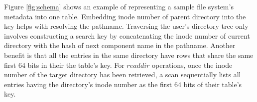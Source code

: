 Figure \ref{fig:schema} shows an example of representing
a sample file system's metadata into one table.
Embedding inode number of parent directory into the key
helps with resolving the pathname.
Traversing the user's directory tree
only involves constructing a search key by concatenating the inode
number of current directory with the hash of
next component name in the pathname.
Another benefit is that all the entries in the same directory have rows that
share the same first 64 bits in their the table's key.
For $readdir$ operations, once the inode number
of the target directory has been retrieved,
a scan sequentially lists all entries having
the directory's inode number as the first 64 bits of their table's key.

